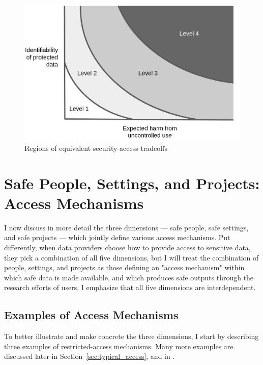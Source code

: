 \begin{figure}
    \centering
    \includegraphics[width=\textwidth]{altman-2015-mod.png}
    \caption{Regions of equivalent security-access tradeoffs}
    \label{fig:altman-2015-mod}
\end{figure}

\section{Safe People, Settings, and Projects: Access Mechanisms}

I now discuss in more detail the three dimensions --- safe people, safe settings, and safe projects --- which jointly define  various access mechanisms. Put differently, when data providers choose how to provide access to sensitive data, they pick a combination of all five dimensions, but I will treat the combination of people, settings, and projects as those defining an "access mechanism" within which safe data is made available, and which produces safe outputs through the research efforts of users. I emphasize that all five dimensions are interdependent. 

\subsection{Examples of Access Mechanisms}

To better illustrate and make concrete the three dimensions, I start by describing three examples of restricted-access mechanisms. Many more examples are discussed later in Section~\ref{sec:typical_access}, and in \cite{shen_physically_2021}.

